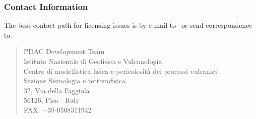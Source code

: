 \newpage
\subsubsection*{Contact Information}

The best contact path for licensing issues is by e-mail to \PDACADDRESS\ 
or send correspondence to:
\begin{verse}
                             PDAC Development Team\\
                             Istituto Nazionale di Geofisica e Vulcanologia\\
			     Centro di modellistica fisica e pericolosit\`a 
			     dei processi vulcanici\\
			     Sezione Sismologia e tettonofisica\\
                             32, Via della Faggiola\\
			     56126, Pisa - Italy\\
                             FAX: +39-0508311942
\end{verse}


